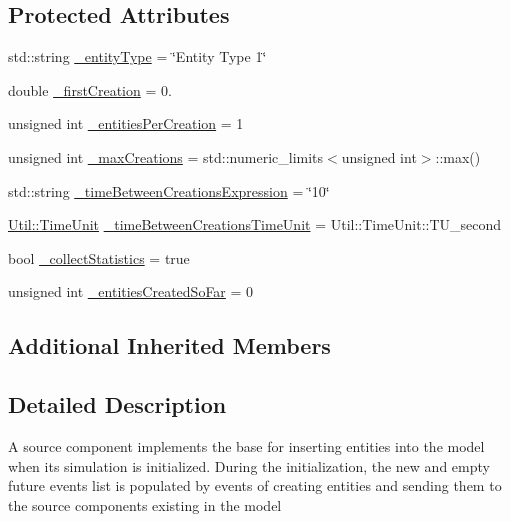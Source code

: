 \subsection*{Protected Attributes}
\begin{DoxyCompactItemize}
\item 
std\-::string \hyperlink{class_source_model_component_ad001e8ae30c828916f271ac72c7817d1}{\-\_\-entity\-Type} = \char`\"{}Entity Type 1\char`\"{}
\item 
double \hyperlink{class_source_model_component_ad58dddde2b6a81d85f261fa8a11243b3}{\-\_\-first\-Creation} = 0.
\item 
unsigned int \hyperlink{class_source_model_component_a68b0576903281a4716eb3ea0281dd133}{\-\_\-entities\-Per\-Creation} = 1
\item 
unsigned int \hyperlink{class_source_model_component_a99525d31bdc32efd5bbdcfbbbf115ec5}{\-\_\-max\-Creations} = std\-::numeric\-\_\-limits$<$unsigned int$>$\-::max()
\item 
std\-::string \hyperlink{class_source_model_component_ab0c96af4d61d8125773fa41cff865211}{\-\_\-time\-Between\-Creations\-Expression} = \char`\"{}10\char`\"{}
\item 
\hyperlink{class_util_aadbd82055afeaa7d4fb4da513de628ff}{Util\-::\-Time\-Unit} \hyperlink{class_source_model_component_af34df20551bc223eb103ca87e9f1463e}{\-\_\-time\-Between\-Creations\-Time\-Unit} = Util\-::\-Time\-Unit\-::\-T\-U\-\_\-second
\item 
bool \hyperlink{class_source_model_component_ac0c009ff9a2e8169d251118dabcd19eb}{\-\_\-collect\-Statistics} = true
\item 
unsigned int \hyperlink{class_source_model_component_af1f4fb38d2c0c4ac08235d7aec131bc9}{\-\_\-entities\-Created\-So\-Far} = 0
\end{DoxyCompactItemize}
\subsection*{Additional Inherited Members}


\subsection{Detailed Description}
A source component implements the base for inserting entities into the model when its simulation is initialized. During the initialization, the new and empty future events list is populated by events of creating entities and sending them to the source components existing in the model 

